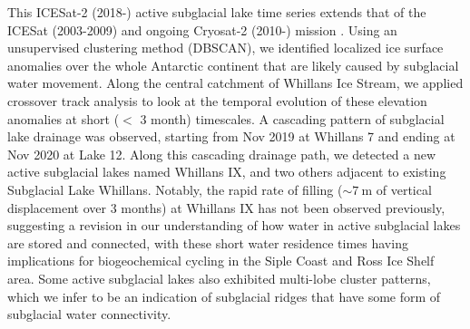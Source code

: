 This ICESat-2 (2018-) active subglacial lake time series extends that of the ICESat (2003-2009) and ongoing Cryosat-2 (2010-) mission \citep{SiegfriedThirteenyearssubglacial2018}.
Using an unsupervised clustering method (\gls{DBSCAN}), we identified localized ice surface anomalies over the whole Antarctic continent that are likely caused by subglacial water movement.
Along the central catchment of Whillans Ice Stream, we applied crossover track analysis to look at the temporal evolution of these elevation anomalies at short ($<$ 3 month) timescales.
A cascading pattern of subglacial lake drainage was observed, starting from Nov 2019 at Whillans 7 and ending at Nov 2020 at Lake 12.
Along this cascading drainage path, we detected a new active subglacial lakes named Whillans IX, and two others adjacent to existing Subglacial Lake Whillans.
Notably, the rapid rate of filling ($\sim\SI{7}{\metre}$ of vertical displacement over 3 months) at Whillans IX has not been observed previously, suggesting a revision in our understanding of how water in active subglacial lakes are stored and connected, with these short water residence times having implications for biogeochemical cycling in the Siple Coast and Ross Ice Shelf area.
Some active subglacial lakes also exhibited multi-lobe cluster patterns, which we infer to be an indication of subglacial ridges that have some form of subglacial water connectivity.
